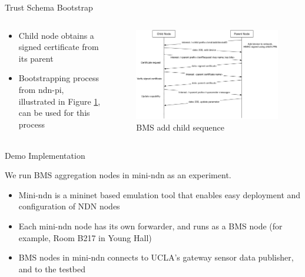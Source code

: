 \documentclass[final,hyperref={pdfpagelabels=false},20pt]{beamer}
\begin{document}
\begin{frame}[t]
\begin{columns}[t]
\begin{column}{.465\textwidth}
\begin{block}{Trust Schema}
Bootstrap

\begin{columns}[T]

\begin{column}{.35\textwidth}

\begin{itemize}
\item{Child node obtains a signed certificate from its parent}
\item{Bootstrapping process from ndn-pi, illustrated in Figure \ref{fig:add-child-sequence}, can be used for this process}
\end{itemize}
\end{column}

\begin{column}{.65\textwidth}
\begin{figure}
\includegraphics[width=\linewidth]{bms-add-child-sequence}
\caption{BMS add child sequence}
\label{fig:add-child-sequence}
\end{figure}
\end{column}

\end{columns}

\end{block}


\begin{block}{Demo Implementation}

We run BMS aggregation nodes in mini-ndn as an experiment.

\begin{itemize}
\item{Mini-ndn is a mininet based emulation tool that enables easy deployment and configuration of NDN nodes \cite{minindn-github}}
\item{Each mini-ndn node has its own forwarder, and runs as a BMS node (for example, Room B217 in Young Hall)}
\item{BMS nodes in mini-ndn connects to UCLA's gateway sensor data publisher, and to the testbed}
\end{itemize}


\end{block}
\end{column}
\end{columns}
\end{frame}
\end{document}

